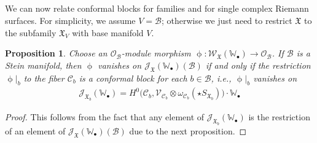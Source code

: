 \documentclass[11pt,b5paper,notitlepage]{article}
\theoremstyle{definition}
\theoremstyle{plain}
\newtheorem{pp}[df]{Proposition}
\newcommand{\fk}{\mathfrak}
\newcommand{\mc}{\mathcal}
\newcommand{\scr}{\mathscr}
\newcommand{\SX}{{S_{\fk X}}}
\newcommand{\blt}{\bullet}
\newcommand{\Wbb}{\mathbb W}
\newcommand{\SXb}{{S_{\fk X_b}}}
\numberwithin{equation}{section}
\begin{document}
\subsection{}


We can now relate conformal blocks for families and for single complex Riemann surfaces. For simplicity, we assume $V=\mc B$; otherwise we just need to restrict $\fk X$ to the subfamily $\fk X_V$ with base manifold $V$.

\begin{pp}\label{lb121}
Choose an $\scr O_{\mc B}$-module morphism $\upphi:\scr W_{\fk X}(\Wbb_\blt)\rightarrow\scr O_{\mc B}$. If $\mc B$ is a Stein manifold, then $\upphi$ vanishes on $\scr J_{\fk X}(\Wbb_\blt)(\mc B)$ if and only if the restriction $\upphi|_b$ to the fiber $\mc C_b$ is a conformal block for each $b\in\mc B$, i.e., $\upphi|_b$ vanishes on \index{JX@$\scr J_{\fk X}(\Wbb_\blt),\scr J_{\fk X_b}(\Wbb_\blt)$}
\begin{align}
\scr J_{\fk X_b}(\Wbb_\blt)=H^0\big(\mc C_b,\scr V_{\mc C_b}\otimes\omega_{\mc C_b}(\star\SXb)\big)\cdot \Wbb_\blt
\end{align}
\end{pp}



\begin{proof}

This follows from the fact that any element of $\scr J_{\fk X_b}(\Wbb_\blt)$ is the restriction of an element of $\scr J_{\fk X}(\Wbb_\blt)(\mc B)$ due to the next proposition.
\end{proof}
\end{document}
